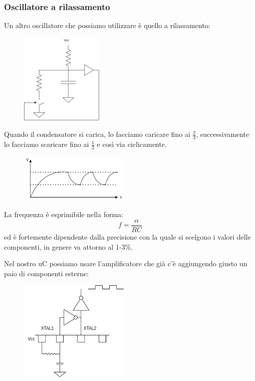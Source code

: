 \subsubsection{Oscillatore a rilassamento}
Un altro oscillatore che possiamo utilizzare è quello a rilassamento:
\begin{figure}[H]
    \centering
    \includegraphics[width=150px]{images/17_Clock/relaxation_oscillator.png}
\end{figure}
Quando il condensatore si carica, lo facciamo caricare fino ai $\frac{2}{3}$, successivamente lo facciamo scaricare fino ai $\frac{1}{3}$ e così via ciclicamente.
\begin{figure}[H]
    \centering
    \includegraphics[width=200px]{images/17_Clock/relaxation_time_graph.png}
\end{figure}
La frequenza è esprimibile nella forma:
$$ f = \frac{\alpha}{RC} $$
ed è fortemente dipendente dalla precisione con la quale si scelgono i valori delle componenti, in genere va attorno al 1-3\%.

Nel nostro uC possiamo usare l'amplificatore che già c'è aggiungendo giusto un paio di componenti esterne:
\begin{figure}[H]
    \centering
    \includegraphics[width=200px]{images/17_Clock/relaxation_in_uC.png}
\end{figure}

